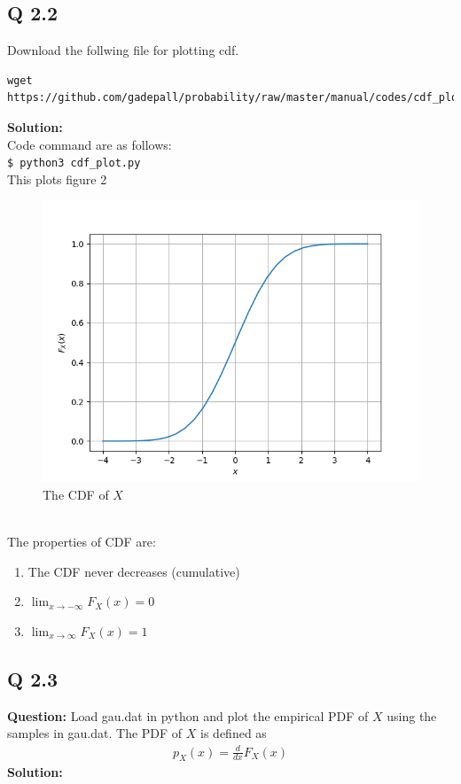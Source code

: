 \documentclass[journal,12pt,twocolumn]{IEEEtran}
\begin{document}
\subsection{Q 2.2}
Download the follwing file for plotting cdf.
\begin{lstlisting}
wget https://github.com/gadepall/probability/raw/master/manual/codes/cdf_plot.py
\end{lstlisting}
\textbf{Solution:}\\
Code command are as follows:\\
\texttt{\$ python3 cdf\_plot.py}\\
This plots figure 2\\
\begin{figure}[!ht]
\centering
\includegraphics[width=\columnwidth]{./figs/Figure_2.png}
    \caption{The CDF of $X$}
\label{fig:gauss_X}
\end{figure}\\



The properties of CDF are:
    \begin{enumerate}
	\item The CDF never decreases (cumulative)
	\item $\lim_{x \to -\infty}F_X(x) = 0$
	\item $\lim_{x \to \infty}F_X(x) = 1$
    \end{enumerate}

\subsection{Q 2.3}
\noindent \textbf{Question:}
Load gau.dat in python and plot the empirical PDF of $X$ using the samples in gau.dat. The PDF of $X$ is defined as
\begin{align}
p_{X}(x) = \frac{d}{dx}F_{X}(x)
\end{align}
\noindent \textbf{Solution:}\\
\end{document}
